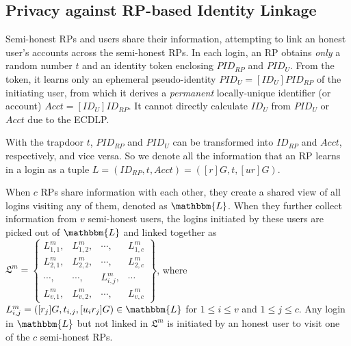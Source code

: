 \subsection{Privacy against RP-based Identity Linkage}
\label{subsec:RP-privacy}

Semi-honest RPs and users share their information, attempting to 
link an honest user's accounts across the semi-honest RPs.
%
In each login, an RP obtains \emph{only} a random number $t$ and an identity token enclosing $PID_{RP}$ and $PID_U$. From the token, it learns only an ephemeral pseudo-identity $PID_{U} = [{ID_U}]{PID_{RP}}$ of the initiating user, from which it derives a \emph{permanent} locally-unique identifier (or account) $Acct = [ID_U]ID_{RP}$.
It cannot directly calculate $ID_U$ from $PID_{U}$ or $Acct$ due to the ECDLP.


With the trapdoor $t$, $PID_{RP}$ and $PID_U$ can be transformed into $ID_{RP}$ and $Acct$, respectively, and vice versa.
So we denote all the information that an RP learns in a login as a tuple $L =(ID_{RP}, t, Acct)=([r]G, t, [ur]G)$.

When $c$ RPs share information with each other, they create a shared view of all logins visiting any of them, denoted as $\mathbbm{L}$.
When they further collect information from $v$ semi-honest users, the logins initiated by these users are picked out of $\mathbbm{L}$ and linked together as
$\mathfrak{L}^m=\left \{ \begin{matrix}
L^m_{1,1},&L^m_{1,2},&\cdots,&L^m_{1,c}\\
L^m_{2,1},& L^m_{2,2},&\cdots,&L^m_{2,c}\\
\cdots,&\cdots,&L^m_{i,j},&\cdots\\
L^m_{v,1},&L^m_{v,2},&\cdots,&L^m_{v,c}
\end{matrix}\right\}$,
where $L^m_{i, j}=([r_j]G, t_{i,j}, [u_ir_j]G) \in \mathbbm{L}$ for $1 \le i \le v$ and $1 \le j \le c$. Any login in $\mathbbm{L}$ but not linked in $\mathfrak{L}^m$ is initiated by an honest user to visit one of the $c$ semi-honest RPs.

